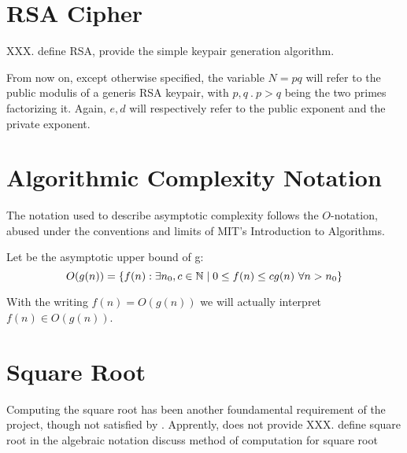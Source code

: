 \section{RSA Cipher}

XXX.
define RSA, provide the simple keypair generation algorithm.

From now on, except otherwise specified, the variable $N=pq$ will refer to the
public modulis of a generis RSA keypair, with $p, q\ .\ p > q$ being the two primes
factorizing it. Again, $e, d$ will respectively refer to the public exponent and
the private exponent.


\section{Algorithmic Complexity Notation}
The notation used to describe asymptotic complexity follows the $O$-notation,
abused under the conventions and limits of MIT's Introduction to Algorithms.

Let  be the asymptotic upper bound of g:
$$
O(g(n)) = \{ f(n) : \exists n_0, c \in \mathbb{N} \mid 0 \leq f(n) \leq cg(n)
             \ \forall n > n_0 \}
$$

With the writing $f(n) = O(g(n))$ we will actually interpret
$f(n) \in O(g(n))$.

\section{Square Root \label{sec:preq:sqrt}}

Computing the square root has been another foundamental requirement of the
project, though not satisfied by \openssl. Apprently,
\openssl does not provide
XXX.
define square root in the algebraic notation
discuss method of computation for square root

